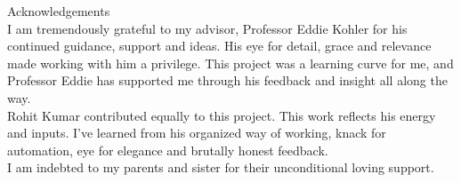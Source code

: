 
{\huge Acknowledgements}
\\

I am tremendously grateful to my advisor, Professor Eddie Kohler for
his continued guidance, support and ideas. His eye for detail, grace and relevance made working with him a
privilege. This project was a learning curve for me, and Professor Eddie has supported me
through his feedback and insight all along the way.\\

Rohit Kumar contributed equally to this project. This work reflects his energy and inputs. I've learned from his organized way of working, knack for automation, eye for elegance and brutally honest feedback.\\

I am indebted to my parents and sister for their unconditional loving support.

